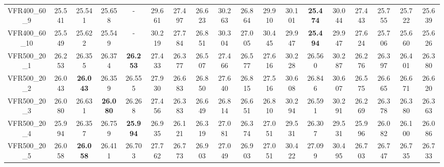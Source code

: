 \begin{tabular}{cc|ccc|ccccccccccccc}
VFR400\_60\_9      & 25.541           & 25.541           & 25.658           & -                & 29.661           & 27.497           & 26.623           & 30.263           & 26.864           & 29.910           & 30.101           & {\bf 25.474}     & 30.044           & 27.443           & 25.755           & 25.722           & 25.639          \\ 
VFR400\_60\_10     & 25.549           & 25.622           & 25.549           & -                & 30.219           & 27.784           & 26.851           & 30.304           & 27.005           & 30.445           & 29.947           & {\bf 25.494}     & 29.947           & 27.624           & 25.706           & 25.660           & 25.626          \\ 
VFR500\_20\_1      & 26.253           & 26.355           & 26.374           & {\bf 26.253}     & 27.433           & 26.377           & 26.507           & 27.466           & 26.577           & 27.616           & 30.228           & 26.560           & 30.287           & 26.276           & 26.397           & 26.401           & 26.380          \\ 
VFR500\_20\_2      & 26.043           & {\bf 26.043}     & 26.359           & 26.555           & 27.930           & 26.683           & 26.850           & 27.640           & 26.815           & 27.516           & 30.608           & 26.846           & 30.607           & 26.575           & 26.665           & 26.671           & 26.620          \\ 
VFR500\_20\_3      & 26.080           & 26.631           & {\bf 26.080}     & 26.268           & 27.456           & 26.383           & 26.649           & 26.814           & 26.651           & 26.810           & 30.294           & 26.591           & 30.291           & 26.269           & 26.378           & 26.380           & 26.363          \\ 
VFR500\_20\_4      & 25.994           & 26.357           & 26.759           & {\bf 25.994}     & 26.935           & 26.121           & 26.319           & 27.081           & 26.374           & 27.051           & 29.531           & 26.307           & 29.531           & 25.996           & 26.082           & 26.100           & 26.086          \\ 
VFR500\_20\_5      & 26.058           & {\bf 26.058}     & 26.411           & 26.703           & 27.762           & 26.773           & 26.903           & 27.049           & 26.903           & 27.051           & 30.422           & 27.099           & 30.495           & 26.703           & 26.747           & 26.735           & 26.733          \\ 

\end{tabular}
